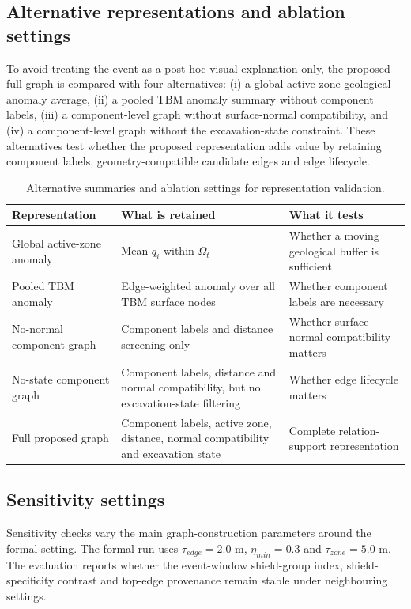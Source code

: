 \subsection{Alternative representations and ablation settings}
To avoid treating the event as a post-hoc visual explanation only, the proposed full graph is compared with four alternatives: (i) a global active-zone geological anomaly average, (ii) a pooled TBM anomaly summary without component labels, (iii) a component-level graph without surface-normal compatibility, and (iv) a component-level graph without the excavation-state constraint. These alternatives test whether the proposed representation adds value by retaining component labels, geometry-compatible candidate edges and edge lifecycle.

\begin{table}[!htbp]
\centering
\caption{Alternative summaries and ablation settings for representation validation.}
\label{tab:alternative_representations}
\small
\begin{tabular}{@{}p{}p{}p{}@{}}
\toprule
Representation & What is retained & What it tests \\
\midrule
Global active-zone anomaly & Mean $q_i$ within $\Omega_t$ & Whether a moving geological buffer is sufficient \\
Pooled TBM anomaly & Edge-weighted anomaly over all TBM surface nodes & Whether component labels are necessary \\
No-normal component graph & Component labels and distance screening only & Whether surface-normal compatibility matters \\
No-state component graph & Component labels, distance and normal compatibility, but no excavation-state filtering & Whether edge lifecycle matters \\
Full proposed graph & Component labels, active zone, distance, normal compatibility and excavation state & Complete relation-support representation \\
\bottomrule
\end{tabular}
\end{table}

\subsection{Sensitivity settings}
Sensitivity checks vary the main graph-construction parameters around the formal setting. The formal run uses $\tau_{edge}=2.0$ m, $\eta_{min}=0.3$ and $\tau_{zone}=5.0$ m. The evaluation reports whether the event-window shield-group index, shield-specificity contrast and top-edge provenance remain stable under neighbouring settings.

